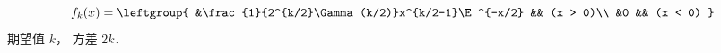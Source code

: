 

\begin{equation}
f_k(x) = \leftgroup{
&\frac{1}{2^{k/2}\Gamma(k/2)}x^{k/2-1}\E^{-x/2} && (x > 0)\\
&0 && (x < 0)
}\end{equation}
期望值 $k$， 方差 $2k$．
